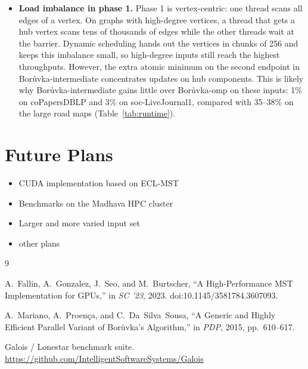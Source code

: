 \documentclass[11pt,a4paper]{article}
\begin{document}
\begin{itemize}
  
  \item \textbf{Load imbalance in phase 1.} Phase 1 is vertex-centric: one thread scans all edges of a vertex. On graphs with high-degree vertices, a thread that gets a hub vertex scans tens of thousands of edges while the other threads wait at the barrier. Dynamic scheduling hands out the vertices in chunks of 256 and keeps this imbalance small, so high-degree inputs still reach the highest throughputs. However, the extra atomic minimum on the second endpoint in Bor\r{u}vka-intermediate concentrates updates on hub components. This is likely why Bor\r{u}vka-intermediate gains little over Bor\r{u}vka-omp on these inputs: 1\% on coPapersDBLP and 3\% on soc-LiveJournal1, compared with 35--38\% on the large road maps (Table~\ref{tab:runtime}).

\end{itemize}






\section*{Future Plans}
\begin{itemize}
  \item {CUDA implementation based on ECL-MST~\cite{fallin2023eclmst}}
  \item {Benchmarks on the Madhava HPC cluster}
  \item {Larger and more varied input set}
  \item {other plans}
\end{itemize}

\begin{thebibliography}{9}

A.~Fallin, A.~Gonzalez, J.~Seo, and M.~Burtscher,
``A High-Performance MST Implementation for GPUs,''
in \emph{SC '23}, 2023. doi:10.1145/3581784.3607093.

A.~Mariano, A.~Proen\c{c}a, and C.~Da~Silva~Sousa,
``A Generic and Highly Efficient Parallel Variant of Bor\r{u}vka's Algorithm,''
in \emph{PDP}, 2015, pp.~610--617.

Galois / Lonestar benchmark suite.
\url{https://github.com/IntelligentSoftwareSystems/Galois}

\end{thebibliography}
\end{document}
